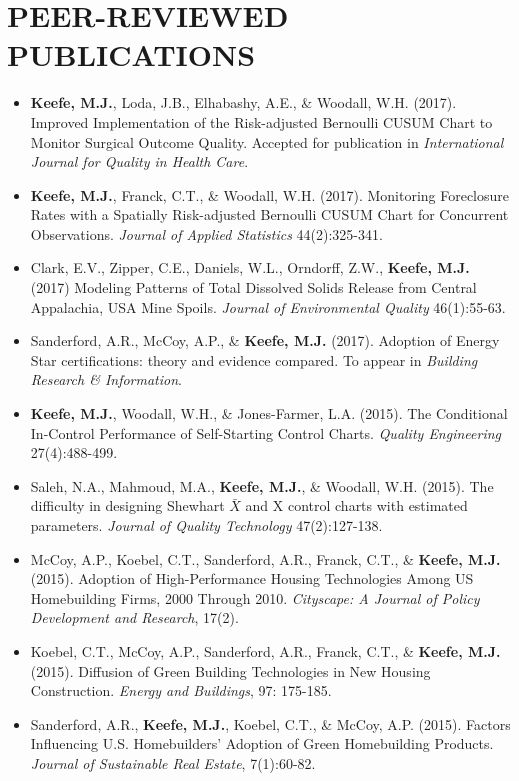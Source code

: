 \documentclass[10pt]{article}
\begin{document}
\section*{PEER-REVIEWED PUBLICATIONS}
\begin{itemize}
 
 \item[] \textbf{Keefe, M.J.}, Loda, J.B., Elhabashy, A.E., \& Woodall, W.H. (2017). Improved Implementation of the Risk-adjusted Bernoulli CUSUM Chart to Monitor Surgical Outcome Quality. Accepted for publication in \textit{International Journal for Quality in Health Care}.
 
\item[] \textbf{Keefe, M.J.}, Franck, C.T., \& Woodall, W.H. (2017). Monitoring Foreclosure Rates with a Spatially Risk-adjusted Bernoulli CUSUM Chart for Concurrent Observations. \textit{Journal of Applied Statistics} 44(2):325-341.

\item[] Clark, E.V., Zipper, C.E., Daniels, W.L., Orndorff, Z.W., \textbf{Keefe, M.J.} (2017) Modeling Patterns of Total Dissolved Solids Release from Central Appalachia, USA Mine Spoils. \textit{Journal of Environmental Quality} 46(1):55-63.

\item[] Sanderford, A.R., McCoy, A.P., \& \textbf{Keefe, M.J.} (2017). Adoption of Energy Star certifications: theory and evidence compared. To appear in \textit{Building Research \& Information}.

\item[] \textbf{Keefe, M.J.}, Woodall, W.H., \& Jones-Farmer, L.A. (2015). The Conditional In-Control Performance of Self-Starting Control Charts. \textit{Quality Engineering} 27(4):488-499.

\item[] Saleh, N.A., Mahmoud, M.A., \textbf{Keefe, M.J.}, \& Woodall, W.H. (2015). The difficulty in designing Shewhart $\bar{X}$ and X control charts with estimated parameters. \textit{Journal of Quality Technology} 47(2):127-138.

\item[] McCoy, A.P., Koebel, C.T., Sanderford, A.R., Franck, C.T., \& \textbf{Keefe, M.J.} (2015). Adoption of High-Performance Housing Technologies Among US Homebuilding Firms, 2000 Through 2010. \textit{Cityscape: A Journal of Policy Development and Research}, 17(2).

\item[] Koebel, C.T., McCoy, A.P., Sanderford, A.R., Franck, C.T., \& \textbf{Keefe, M.J.} (2015). Diffusion of Green Building Technologies in New Housing Construction. \textit{Energy and Buildings}, 97: 175-185.

\item[] Sanderford, A.R., \textbf{Keefe, M.J.}, Koebel, C.T., \& McCoy, A.P. (2015). Factors Influencing U.S. Homebuilders' Adoption of Green Homebuilding Products. \textit{Journal of Sustainable Real Estate}, 7(1):60-82.

\end{itemize}
\end{document}
